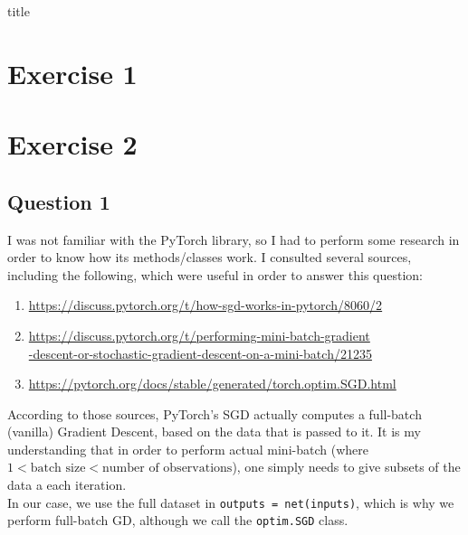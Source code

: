 \documentclass[12pt]{article}
\begin{document}
{title}

\tableofcontents
\listoffigures




\section{Exercise 1}
\section{Exercise 2}
\subsection{Question 1}
I was not familiar with the PyTorch library, so I had to perform some research in order to know how its methods/classes work. I consulted several sources, including the following, which were useful in order to answer this question:
\begin{enumerate}
    \item \href{https://discuss.pytorch.org/t/how-sgd-works-in-pytorch/8060/2}{https://discuss.pytorch.org/t/how-sgd-works-in-pytorch/8060/2}
    \item \href{https://discuss.pytorch.org/t/performing-mini-batch-gradient-descent-or-stochastic-gradient-descent-on-a-mini-batch/21235}{https://discuss.pytorch.org/t/performing-mini-batch-gradient} \\
          \href{https://discuss.pytorch.org/t/performing-mini-batch-gradient-descent-or-stochastic-gradient-descent-on-a-mini-batch/21235}{-descent-or-stochastic-gradient-descent-on-a-mini-batch/21235}

    \item \href{https://pytorch.org/docs/stable/generated/torch.optim.SGD.html}{https://pytorch.org/docs/stable/generated/torch.optim.SGD.html}
\end{enumerate}
According to those sources, PyTorch's SGD actually computes a full-batch (vanilla) Gradient Descent, based on the data that is passed to it.
It is my understanding that in order to perform actual mini-batch (\ie where $1 < \text{batch size} < \text{number of observations}$), one simply needs to give subsets of the data a each iteration. \\
In our case, we use the full dataset in \texttt{outputs = net(inputs)}, which is why we perform full-batch GD, although we call the \texttt{optim.SGD} class.
\end{document}
